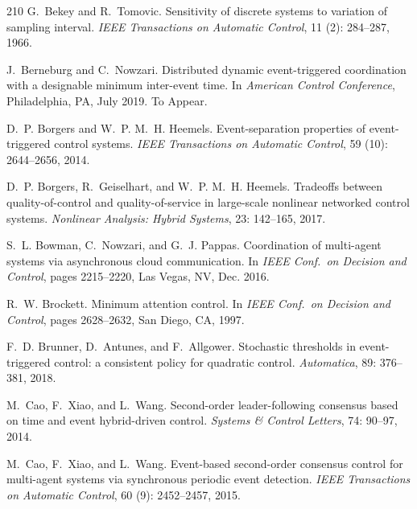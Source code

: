 \documentclass{autart}
\begin{document}
{\begin{thebibliography}{210}
G.~Bekey and R.~Tomovic.
\newblock Sensitivity of discrete systems to variation of sampling interval.
\newblock \emph{IEEE Transactions on Automatic Control}, 11
  (2): 284--287, 1966.

J.~Berneburg and C.~Nowzari.
\newblock Distributed dynamic event-triggered coordination with a designable
  minimum inter-event time.
\newblock In \emph{{A}merican {C}ontrol {C}onference}, Philadelphia, PA, July
  2019.
\newblock To Appear.

D.~P. Borgers and W.~P. M.~H. Heemels.
\newblock Event-separation properties of event-triggered control systems.
\newblock \emph{IEEE Transactions on Automatic Control}, 59
  (10): 2644--2656, 2014.

D.~P. Borgers, R.~Geiselhart, and W.~P. M.~H. Heemels.
\newblock Tradeoffs between quality-of-control and quality-of-service in
  large-scale nonlinear networked control systems.
\newblock \emph{Nonlinear Analysis: Hybrid Systems}, 23: 142--165,
  2017.

S.~L. Bowman, C.~Nowzari, and G.~J. Pappas.
\newblock Coordination of multi-agent systems via asynchronous cloud
  communication.
\newblock In \emph{{IEEE} Conf.\ on Decision and Control}, pages 2215--2220,
  Las Vegas, NV, Dec. 2016.

R.~W. Brockett.
\newblock Minimum attention control.
\newblock In \emph{{IEEE} Conf.\ on Decision and Control}, pages 2628--2632,
  San Diego, CA, 1997.

F.~D. Brunner, D.~Antunes, and F.~Allgower.
\newblock Stochastic thresholds in event-triggered control: a consistent policy
  for quadratic control.
\newblock \emph{Automatica}, 89: 376--381, 2018.

M.~Cao, F.~Xiao, and L.~Wang.
\newblock Second-order leader-following consensus based on time and event
  hybrid-driven control.
\newblock \emph{Systems \& Control Letters}, 74: 90--97, 2014.

M.~Cao, F.~Xiao, and L.~Wang.
\newblock Event-based second-order consensus control for multi-agent systems
  via synchronous periodic event detection.
\newblock \emph{IEEE Transactions on Automatic Control}, 60
  (9): 2452--2457, 2015.


\end{thebibliography}}
\end{document}
